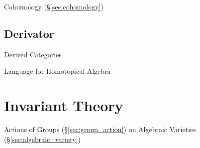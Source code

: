 \fist Cohomology (\S\ref{sec:cohomology})



\subsection{Derivator}\label{sec:derivator}

Derived Categories

Language for Homotopical Algebra



\section{Invariant Theory}\label{sec:invariant_theory}

Actions of Groups (\S\ref{sec:group_action}) on Algebraic Varieties
(\S\ref{sec:algebraic_variety})
